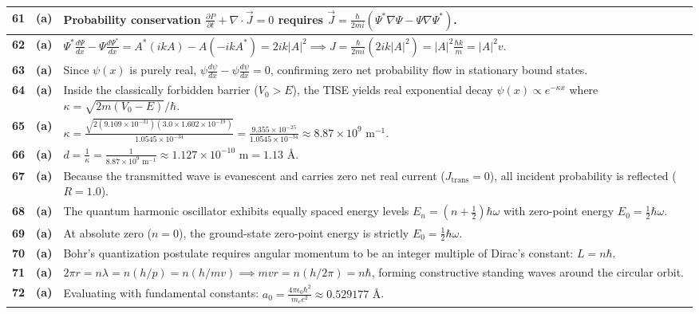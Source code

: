 {\begin{tabularx}{\textwidth}{|c|c|X|}
\textbf{61} & \textbf{(a)} & Probability conservation $\frac{\partial P}{\partial t} + \nabla \cdot \vec{J} = 0$ requires $\vec{J} = \frac{\hbar}{2mi}(\Psi^*\nabla\Psi - \Psi\nabla\Psi^*)$. \\ \hline
\textbf{62} & \textbf{(a)} & $\Psi^*\frac{d\Psi}{dx} - \Psi\frac{d\Psi^*}{dx} = A^*(ik A) - A(-ik A^*) = 2ik|A|^2 \implies J = \frac{\hbar}{2mi}(2ik|A|^2) = |A|^2 \frac{\hbar k}{m} = |A|^2 v$. \\ \hline
\textbf{63} & \textbf{(a)} & Since $\psi(x)$ is purely real, $\psi\frac{d\psi}{dx} - \psi\frac{d\psi}{dx} = 0$, confirming zero net probability flow in stationary bound states. \\ \hline
\textbf{64} & \textbf{(a)} & Inside the classically forbidden barrier ($V_0 > E$), the TISE yields real exponential decay $\psi(x) \propto e^{-\kappa x}$ where $\kappa = \sqrt{2m(V_0-E)}/\hbar$. \\ \hline
\textbf{65} & \textbf{(a)} & $\kappa = \frac{\sqrt{2(9.109 \times 10^{-31})(3.0 \times 1.602 \times 10^{-19})}}{1.0545 \times 10^{-34}} = \frac{9.355 \times 10^{-25}}{1.0545 \times 10^{-34}} \approx 8.87 \times 10^9\text{ m}^{-1}$. \\ \hline
\textbf{66} & \textbf{(a)} & $d = \frac{1}{\kappa} = \frac{1}{8.87 \times 10^9\text{ m}^{-1}} \approx 1.127 \times 10^{-10}\text{ m} = 1.13\text{ \AA}$. \\ \hline
\textbf{67} & \textbf{(a)} & Because the transmitted wave is evanescent and carries zero net real current ($J_{\text{trans}} = 0$), all incident probability is reflected ($R = 1.0$). \\ \hline
\textbf{68} & \textbf{(a)} & The quantum harmonic oscillator exhibits equally spaced energy levels $E_n = (n + \frac{1}{2})\hbar\omega$ with zero-point energy $E_0 = \frac{1}{2}\hbar\omega$. \\ \hline
\textbf{69} & \textbf{(a)} & At absolute zero ($n=0$), the ground-state zero-point energy is strictly $E_0 = \frac{1}{2}\hbar\omega$. \\ \hline
\textbf{70} & \textbf{(a)} & Bohr's quantization postulate requires angular momentum to be an integer multiple of Dirac's constant: $L = n\hbar$. \\ \hline
\textbf{71} & \textbf{(a)} & $2\pi r = n\lambda = n(h/p) = n(h/mv) \implies mvr = n(h/2\pi) = n\hbar$, forming constructive standing waves around the circular orbit. \\ \hline
\textbf{72} & \textbf{(a)} & Evaluating with fundamental constants: $a_0 = \frac{4\pi\epsilon_0\hbar^2}{m_e e^2} \approx 0.529177\text{ \AA}$. \\ \hline

\end{tabularx}}
